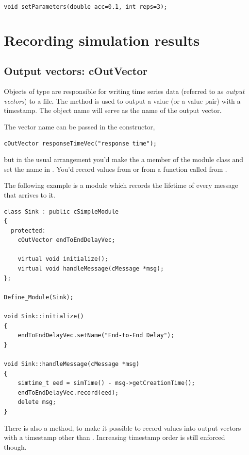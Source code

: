 \begin{verbatim}
void setParameters(double acc=0.1, int reps=3);
\end{verbatim}




\section{Recording simulation results}

\subsection{Output vectors: cOutVector}
\label{sec:ch-sim-lib:coutvector}

Objects of type  are responsible for writing time series
data (referred to as \textit{output vectors}) to a file. The 
method is used to output a value (or a value pair) with a timestamp.
The object name will serve as the name of the output vector.

The vector name can be passed in the constructor,

\begin{verbatim}
cOutVector responseTimeVec("response time");
\end{verbatim}

but in the usual arrangement you'd make the  a member
of the module class and set the name in . You'd
record values from  or from a function called from
.

The following example is a  module which records the lifetime
of every message that arrives to it.

\begin{verbatim}
class Sink : public cSimpleModule
{
  protected:
    cOutVector endToEndDelayVec;

    virtual void initialize();
    virtual void handleMessage(cMessage *msg);
};

Define_Module(Sink);

void Sink::initialize()
{
    endToEndDelayVec.setName("End-to-End Delay");
}

void Sink::handleMessage(cMessage *msg)
{
    simtime_t eed = simTime() - msg->getCreationTime();
    endToEndDelayVec.record(eed);
    delete msg;
}
\end{verbatim}

There is also a  method, to make it
possible to record values into output vectors with a timestamp other than
. Increasing timestamp order is still enforced though.

